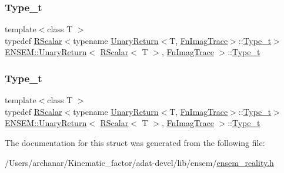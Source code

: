 \subsubsection{\texorpdfstring{Type\_t}{Type\_t}\hspace{0.1cm}{\footnotesize\ttfamily [2/3]}}
{\footnotesize\ttfamily template$<$class T $>$ \\
typedef \mbox{\hyperlink{classENSEM_1_1RScalar}{R\+Scalar}}$<$typename \mbox{\hyperlink{structENSEM_1_1UnaryReturn}{Unary\+Return}}$<$T, \mbox{\hyperlink{structENSEM_1_1FnImagTrace}{Fn\+Imag\+Trace}}$>$\+::\mbox{\hyperlink{structENSEM_1_1UnaryReturn_3_01RScalar_3_01T_01_4_00_01FnImagTrace_01_4_ade2d3556f547d545e7db88cb51393a3d}{Type\+\_\+t}}$>$ \mbox{\hyperlink{structENSEM_1_1UnaryReturn}{E\+N\+S\+E\+M\+::\+Unary\+Return}}$<$ \mbox{\hyperlink{classENSEM_1_1RScalar}{R\+Scalar}}$<$ T $>$, \mbox{\hyperlink{structENSEM_1_1FnImagTrace}{Fn\+Imag\+Trace}} $>$\+::\mbox{\hyperlink{structENSEM_1_1UnaryReturn_3_01RScalar_3_01T_01_4_00_01FnImagTrace_01_4_ade2d3556f547d545e7db88cb51393a3d}{Type\+\_\+t}}}

\mbox{\label{structENSEM_1_1UnaryReturn_3_01RScalar_3_01T_01_4_00_01FnImagTrace_01_4_ade2d3556f547d545e7db88cb51393a3d}} 
\subsubsection{\texorpdfstring{Type\_t}{Type\_t}\hspace{0.1cm}{\footnotesize\ttfamily [3/3]}}
{\footnotesize\ttfamily template$<$class T $>$ \\
typedef \mbox{\hyperlink{classENSEM_1_1RScalar}{R\+Scalar}}$<$typename \mbox{\hyperlink{structENSEM_1_1UnaryReturn}{Unary\+Return}}$<$T, \mbox{\hyperlink{structENSEM_1_1FnImagTrace}{Fn\+Imag\+Trace}}$>$\+::\mbox{\hyperlink{structENSEM_1_1UnaryReturn_3_01RScalar_3_01T_01_4_00_01FnImagTrace_01_4_ade2d3556f547d545e7db88cb51393a3d}{Type\+\_\+t}}$>$ \mbox{\hyperlink{structENSEM_1_1UnaryReturn}{E\+N\+S\+E\+M\+::\+Unary\+Return}}$<$ \mbox{\hyperlink{classENSEM_1_1RScalar}{R\+Scalar}}$<$ T $>$, \mbox{\hyperlink{structENSEM_1_1FnImagTrace}{Fn\+Imag\+Trace}} $>$\+::\mbox{\hyperlink{structENSEM_1_1UnaryReturn_3_01RScalar_3_01T_01_4_00_01FnImagTrace_01_4_ade2d3556f547d545e7db88cb51393a3d}{Type\+\_\+t}}}



The documentation for this struct was generated from the following file\+:\begin{DoxyCompactItemize}
\item 
/\+Users/archanar/\+Kinematic\+\_\+factor/adat-\/devel/lib/ensem/\mbox{\hyperlink{adat-devel_2lib_2ensem_2ensem__reality_8h}{ensem\+\_\+reality.\+h}}\end{DoxyCompactItemize}
